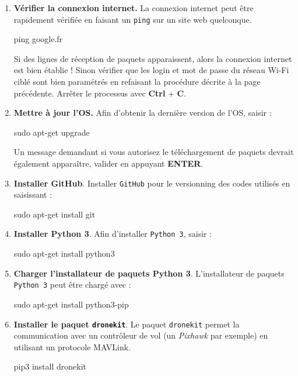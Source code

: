 \documentclass[a4paper, 10pt]{article}
\begin{document}
\begin{enumerate}
	\item\textbf{Vérifier la connexion internet.} La connexion internet 
	peut être rapidement vérifiée en faisant un \texttt{ping} sur un
	site web quelconque.
	
\begin{commandshell}
ping google.fr
\end{commandshell}

	Si des lignes de réception de paquets apparaissent, alors la
	connexion internet est bien établie ! Sinon vérifier que les
	login et mot de passe du réseau Wi-Fi ciblé sont bien paramétrés
	en refaisant la procédure décrite à la page précédente.	
	Arrêter le processus avec \textbf{Ctrl} + \textbf{C}.
	
	\item\textbf{Mettre à jour l'OS.} Afin d'obtenir la dernière version
	de l'OS, saisir :
	
\begin{commandshell}
sudo apt-get upgrade
\end{commandshell}
	
	Un message demandant si vous autorisez le téléchargement de paquets
	devrait également apparaître, valider en appuyant \textbf{ENTER}.
	
	\item\textbf{Installer GitHub}. Installer \texttt{GitHub} pour le 
	versionning des codes utilisés en saisissant :
	
\begin{commandshell}
sudo apt-get install git
\end{commandshell}	
	
	\item\textbf{Installer Python 3}. Afin d'installer \texttt{Python 3},
	saisir :
	
\begin{commandshell}
sudo apt-get install python3
\end{commandshell}

	\item\textbf{Charger l'installateur de paquets Python 3}. 
	L'installateur de paquets \texttt{Python 3} peut être chargé avec :
	
\begin{commandshell}
sudo apt-get install python3-pip
\end{commandshell}

	\item\textbf{Installer le paquet \texttt{dronekit}}. 
	Le paquet \texttt{dronekit} permet la communication avec un
	contrôleur de vol (un \textit{Pixhawk} par exemple) en 
	utilisant un protocole MAVLink.
	
\begin{commandshell}
pip3 install dronekit
\end{commandshell}
\end{enumerate}
\end{document}
